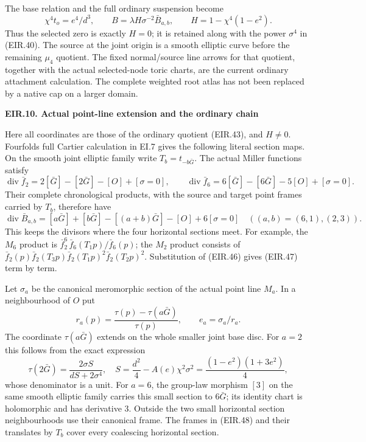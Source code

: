 The base relation and the full ordinary suspension become
\[
 \chi^4t_o=e^4/d^3,\qquad
 B=\lambda H\sigma^{-2}\bar B_{a,b},\qquad
 H=1-\chi^4(1-e^2).
 \tag{EIR.45}
\]
Thus the selected zero is exactly \(H=0\); it is retained along
with the power \(\sigma^4\) in (EIR.40). The source at the
joint origin is a smooth elliptic curve before the remaining
\(\mu_4\) quotient. The fixed normal/source line arrows for that
quotient, together with the actual selected-node toric charts,
are the current ordinary attachment calculation. The complete
weighted root atlas has not been replaced by a native cap on
a larger domain.

\par

\medskip\noindent\textbf{EIR.10. Actual point-line extension and the ordinary chain}

\par\nobreak

Here all coordinates are those of the ordinary quotient (EIR.43),
and \(H\ne0\). Fourfold\textquotesingle s full Cartier calculation in EI.7 gives
the following literal section maps. On the smooth joint elliptic
family write \(T_b=t_{-b\bar G}\). The actual Miller functions satisfy
\[
 \operatorname{div}\bar f_2
   =2[\bar G]-[2\bar G]-[O]+[\sigma=0],
\qquad
 \operatorname{div}\bar f_6
   =6[\bar G]-[6\bar G]-5[O]+[\sigma=0].
 \tag{EIR.46}
\]
Their complete chronological products, with the source and target
point frames carried by \(T_b\), therefore have
\[
 \operatorname{div}\bar B_{a,b}
 =[a\bar G]+[b\bar G]-[(a+b)\bar G]-[O]+6[\sigma=0]
 \quad ((a,b)=(6,1),(2,3)).
 \tag{EIR.47}
\]
This keeps the divisors where the four horizontal sections meet.
For example, the \(M_6\) product is
\(\bar f_2^6\,\bar f_6(T_1p)/\bar f_6(p)\); the \(M_2\)
product consists of
\(\bar f_2(p)\bar f_2(T_3p)
  \bar f_2(T_1p)^2\bar f_2(T_2p)^2\).
Substitution of (EIR.46) gives (EIR.47) term by term.

Let \(\sigma_a\) be the canonical meromorphic section of the
actual point line \(M_a\). In a neighbourhood of \(O\) put
\[
 r_a(p)=\frac{\tau(p)-\tau(a\bar G)}{\tau(p)},\qquad
 e_a=\sigma_a/r_a .
 \tag{EIR.48}
\]
The coordinate \(\tau(a\bar G)\) extends on the whole smaller
joint base disc. For \(a=2\) this follows from the exact expression
\[
 \tau(2\bar G)=\frac{2\sigma S}{dS+2\sigma^4},
 \quad
 S=\frac{d^2}{4}-A(e)\chi^2\sigma^2
   =\frac{(1-e^2)(1+3e^2)}4,
 \tag{EIR.49}
\]
whose denominator is a unit. For \(a=6\), the group-law morphism
\([3]\) on the same smooth elliptic family carries this small
section to \(6\bar G\); its identity chart is holomorphic and has
derivative \(3\). Outside the two small horizontal section
neighbourhoods use their canonical frame. The frames in (EIR.48)
and their translates by \(T_b\) cover every coalescing horizontal
section.

